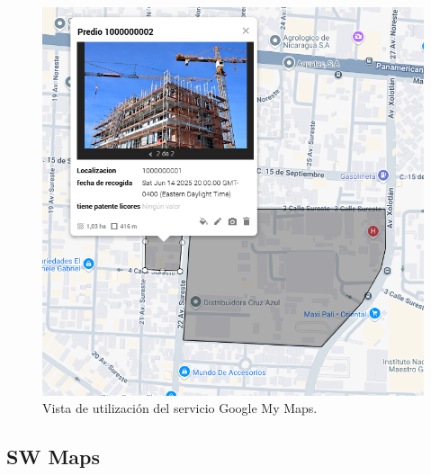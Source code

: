 \begin{figure}[h]
    \centering
    \includegraphics[scale=0.5]{Graphics/google_my_maps_descripcion.png}
    \caption{Vista de utilización del servicio Google My Maps.}
    \label{fig:figura6}
\end{figure}

\pagebreak








\subsection{SW Maps}

